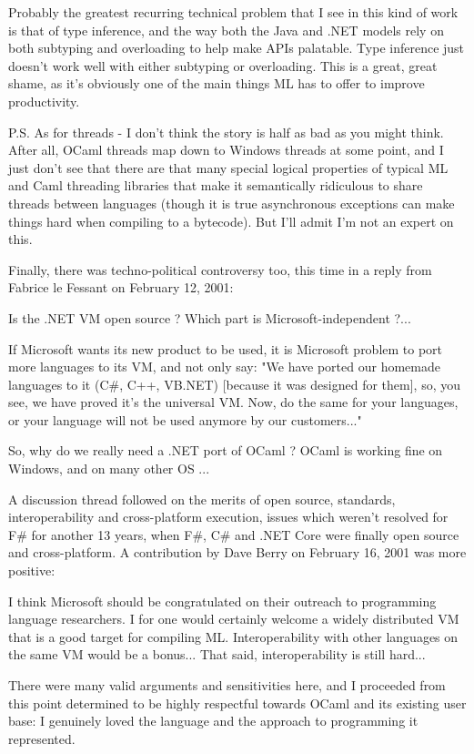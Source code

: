 \documentclass[acmsmall,review]{acmart}\settopmatter{printfolios=true,printccs=false,printacmref=false}
\begin{document}
\begin{verbquote}
Probably the greatest recurring technical problem that I see in this kind of work is that of type inference, and the way both the Java and .NET models rely on both subtyping and overloading to help make APIs palatable.  Type inference just doesn't work well with either subtyping or overloading.  This is a great, great shame, as it's obviously one of the main things ML has to offer to improve productivity.  

P.S. As for threads - I don't think the story is half as bad as you might think.  After all, OCaml threads map down to Windows threads at some point, and I just don't see that there are that many special logical properties of typical ML and Caml threading libraries that make it semantically ridiculous to share threads between languages (though it is true asynchronous exceptions can make things hard when compiling to a bytecode).  But I'll admit I'm not an expert on this. 
\end{verbquote}
Finally, there was techno-political controversy too, this time in a reply from Fabrice le Fessant on February 12, 2001:
\begin{verbquote}
Is the .NET VM open source ? Which part is Microsoft-independent ?...

If Microsoft wants its new product to be used, it is Microsoft problem to port more languages to its VM, and not only say: "We have ported our homemade languages to it (C\#, C++, VB.NET) [because it was designed for them], so, you see, we have proved it's the universal VM. Now, do the same for your languages, or your language will not be used anymore by our customers..."

So, why do we really need a .NET port of OCaml ? OCaml is working fine on Windows, and on many other OS ... 
\end{verbquote}
A discussion thread followed on the merits of open source, standards, interoperability and cross-platform execution, issues which weren’t resolved for F\# for another 13 years, when F\#, C\# and .NET Core were finally open source and cross-platform.  A contribution by Dave Berry on February 16, 2001 was more positive:
\begin{verbquote}
I think Microsoft should be congratulated on their outreach to programming language researchers.  I for one would certainly welcome a widely distributed VM that is a good target for compiling ML.  Interoperability with other languages on the same VM would be a bonus... That said, interoperability is still hard...
\end{verbquote}
There were many valid arguments and sensitivities here, and I proceeded from this point determined to be highly respectful towards OCaml and its existing user base: I genuinely loved the language and the approach to programming it represented. 
\end{document}
